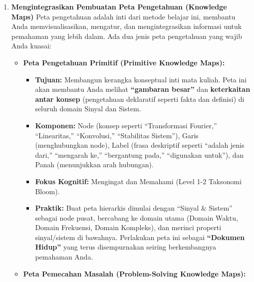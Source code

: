 \documentclass[
  letterpaper,
  DIV=11,
  numbers=noendperiod]{scrreprt}
\providecommand{\tightlist}{%
  \setlength{\itemsep}{0pt}\setlength{\parskip}{0pt}}
\begin{document}
\begin{enumerate}
\def\labelenumi{\arabic{enumi}.}
\item
  \textbf{Mengintegrasikan Pembuatan Peta Pengetahuan (Knowledge Maps)}
  Peta pengetahuan adalah inti dari metode belajar ini, membantu Anda
  memvisualisasikan, mengatur, dan mengintegrasikan informasi untuk
  pemahaman yang lebih dalam. Ada dua jenis peta pengetahuan yang wajib
  Anda kuasai:

  \begin{itemize}
  \tightlist
  \item
    \textbf{Peta Pengetahuan Primitif (Primitive Knowledge Maps):}

    \begin{itemize}
    \tightlist
    \item
      \textbf{Tujuan:} Membangun kerangka konseptual inti mata kuliah.
      Peta ini akan membantu Anda melihat \textbf{``gambaran besar''}
      dan \textbf{keterkaitan antar konsep} (pengetahuan deklaratif
      seperti fakta dan definisi) di seluruh domain Sinyal dan Sistem.
    \item
      \textbf{Komponen:} Node (konsep seperti ``Transformasi Fourier,''
      ``Linearitas,'' ``Konvolusi,'' ``Stabilitas Sistem''), Garis
      (menghubungkan node), Label (frasa deskriptif seperti ``adalah
      jenis dari,'' ``mengarah ke,'' ``bergantung pada,'' ``digunakan
      untuk''), dan Panah (menunjukkan arah hubungan).
    \item
      \textbf{Fokus Kognitif:} Mengingat dan Memahami (Level 1-2
      Taksonomi Bloom).
    \item
      \textbf{Praktik:} Buat peta hierarkis dimulai dengan ``Sinyal \&
      Sistem'' sebagai node pusat, bercabang ke domain utama (Domain
      Waktu, Domain Frekuensi, Domain Kompleks), dan merinci properti
      sinyal/sistem di bawahnya. Perlakukan peta ini sebagai
      \textbf{``Dokumen Hidup''} yang terus disempurnakan seiring
      berkembangnya pemahaman Anda.
    \end{itemize}
  \item
    \textbf{Peta Pemecahan Masalah (Problem-Solving Knowledge Maps):}


\end{itemize}
\end{enumerate}
\end{document}
